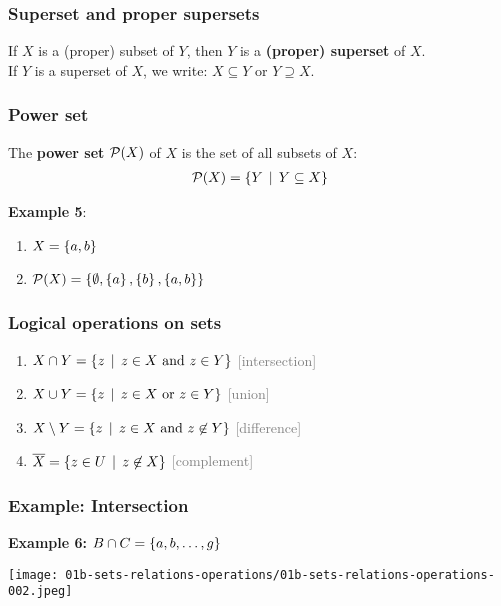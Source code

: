 \documentclass[fleqn,10pt,serif,xcolor=svgnames,xcolor=table,aspectratio=169,handout]{beamer}
\newcommand{\mygray}[1]{\textcolor{gray}{#1}}
\begin{document}
\begin{frame}
  \frametitle{Superset and proper supersets}
  If $X$ is a (proper) subset of $Y$, then $Y$ is a \textbf{(proper) superset} of $X$.\\
  If $Y$ is a superset of $X$, we write: $X \subseteq Y$ or $Y \supseteq X$.
\end{frame}

\begin{frame}

\frametitle{Power set}

  The \textbf{power set} $\mathcal{P}(X)$ of $X$ is the set of all subsets of $X$:
  \begin{align*}
    \mathcal{P}(X) = \left\{Y \thinspace \mid \thinspace Y \subseteq X\right\}
  \end{align*}

  \bigskip

  \textbf{Example 5}:

    \begin{enumerate}[]
      \item $X = \left\{a,b\right\}$
      \item $\mathcal{P}(X) = \left\{\emptyset, \left\{a\right\}, \left\{b\right\}, \left\{a,b\right\}\right\}$
    \end{enumerate}

\end{frame}

\begin{frame}
  \frametitle{Logical operations on sets}
\begin{enumerate}[]
\item $X \cap Y = \left\{z \thinspace \mid \thinspace z \in X \text{ and } z \in Y\right\}$ \hfill \mygray{[intersection]}
\item $X \cup Y = \left\{z \thinspace \mid \thinspace z \in X \text{ or } z \in Y\right\}$ \hfill \mygray{[union]}
\item $X \setminus Y = \left\{z \thinspace \mid \thinspace z \in X \text{ and } z \not \in Y\right\}$ \hfill
  \mygray{[difference]}
\item $\overline{X} = \left\{z \in U \thinspace \mid \thinspace z \not \in X \right\}$ \hfill
  \mygray{[complement]}
\end{enumerate}

\end{frame}

\begin{frame}
  \frametitle{Example: Intersection}

  \hfill \textbf{Example 6: $B \cap C = \left\{a, b , \dots, g\right\}$}

  \bigskip

  \hfill \texttt{[image: 01b-sets-relations-operations/01b-sets-relations-operations-002.jpeg]}

\end{frame}
\end{document}
